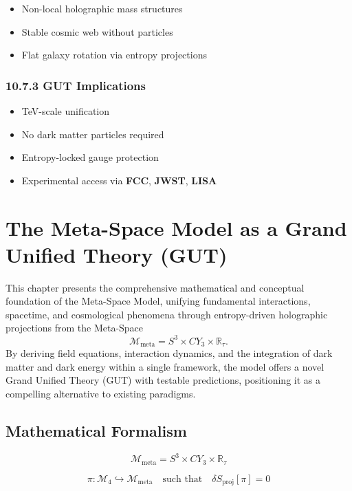 \documentclass[10.5pt,a4paper]{article}
\begin{document}
\begin{itemize}
    \item Non-local holographic mass structures
    \item Stable cosmic web without particles
    \item Flat galaxy rotation via entropy projections
\end{itemize}

\subsubsection*{10.7.3 GUT Implications}

\begin{itemize}
    \item TeV-scale unification
    \item No dark matter particles required
    \item Entropy-locked gauge protection
    \item Experimental access via \textbf{FCC}, \textbf{JWST}, \textbf{LISA}
\end{itemize}

\clearpage

\section{The Meta-Space Model as a Grand Unified Theory (GUT)}

This chapter presents the comprehensive mathematical and conceptual foundation of the Meta-Space Model, unifying fundamental interactions, spacetime, and cosmological phenomena through entropy-driven holographic projections from the Meta-Space 
\[
\mathcal{M}_{\text{meta}} = S^3 \times CY_3 \times \mathbb{R}_\tau.
\]
By deriving field equations, interaction dynamics, and the integration of dark matter and dark energy within a single framework, the model offers a novel Grand Unified Theory (GUT) with testable predictions, positioning it as a compelling alternative to existing paradigms.

\subsection{Mathematical Formalism}

\[
\mathcal{M}_{\text{meta}} = S^3 \times CY_3 \times \mathbb{R}_\tau
\]

\[
\pi: \mathcal{M}_4 \hookrightarrow \mathcal{M}_{\text{meta}} \quad \text{such that} \quad \delta S_{\text{proj}}[\pi] = 0
\]
\end{document}
